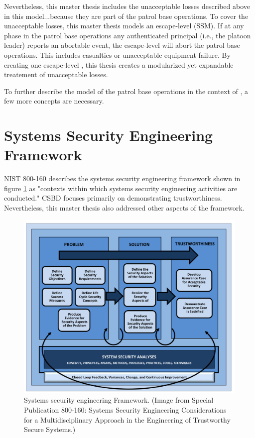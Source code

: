 \documentclass[../../main/main.tex]{subfiles}
\begin{document}
Nevertheless, this master thesis includes the unacceptable losses described above in this model...because they are part of the patrol base operations.  To cover the unacceptable losses, this master thesis models an escape-level  (SSM).  If at any phase in the patrol base operations any authenticated principal (i.e., the platoon leader) reports an abortable event, the escape-level  will abort the patrol base operations. This includes casualties or unacceptable equipment failure.  By creating one escape-level , this thesis creates a modularized yet expandable treatement of unacceptable losses.


To further describe the model of the patrol base operations in the context of , a few more concepts are necessary.  

\section{Systems Security Engineering Framework}\label{sssec:sseframework}
NIST 800-160 describes the systems security engineering framework shown in figure \ref{sseframework} as "contexts within which systems security engineering activities are conducted."  CSBD focuses primarily on demonstrating trustworthiness.  Nevertheless, this master thesis also addressed other aspects of the framework.  

\begin{figure}[h]
\includegraphics[width=\linewidth]{../figures/sseframework}
\caption{\label{sseframework}Systems security engineering Framework. (Image from  Special Publication 800-160: Systems Security Engineering Considerations for a Multidisciplinary Approach in the Engineering of Trustworthy Secure Systems.)}
\end{figure}
\end{document}
